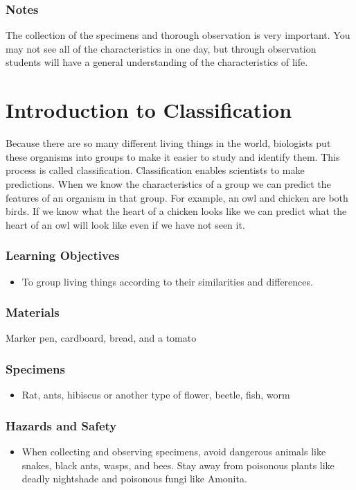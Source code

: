 \subsubsection*{Notes}
The collection of the specimens and thorough observation is very important. You may not see all of the characteristics in one day, but through observation students will have a general understanding of the characteristics of life.


\section{Introduction to Classification}
Because there are so many different living things in the world, biologists put these organisms into groups to make it easier to study and identify them. This process is called classification. Classification enables scientists to make predictions. When we know the characteristics of a group we can predict the features of an organism in that group. For example, an owl and chicken are both birds. If we know what the heart of a chicken looks like we can predict what the heart of an owl will look like even if we have not seen it.

\subsubsection*{Learning Objectives}
\begin{itemize}
\item{To group living things according to their similarities and differences.}
\end{itemize}

\subsubsection*{Materials}
Marker pen, cardboard, bread, and a tomato

\subsubsection*{Specimens}
\begin{itemize}
\item{Rat, ants, hibiscus or another type of flower, beetle, fish, worm}
\end{itemize}

\subsubsection*{Hazards and Safety}
\begin{itemize}
\item{When collecting and observing specimens, avoid dangerous animals like snakes, black ants, wasps, and bees. Stay away from poisonous plants like deadly nightshade and poisonous fungi like Amonita.}
\end{itemize}

